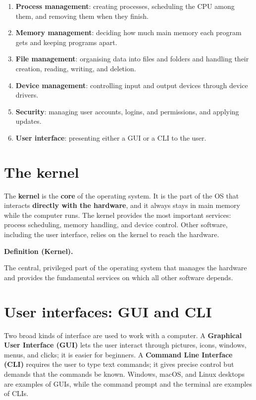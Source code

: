 \documentclass[11pt]{article}
\newenvironment{definitionbox}[1]{%
  \par\noindent\textbf{Definition (#1).}\ \itshape
}{\par\vspace{0.3em}}
\begin{document}
\begin{enumerate}
  \item \textbf{Process management}: creating processes, scheduling the CPU
    among them, and removing them when they finish.
  \item \textbf{Memory management}: deciding how much main memory each
    program gets and keeping programs apart.
  \item \textbf{File management}: organising data into files and folders and
    handling their creation, reading, writing, and deletion.
  \item \textbf{Device management}: controlling input and output devices
    through device drivers.
  \item \textbf{Security}: managing user accounts, logins, and permissions, and
    applying updates.
  \item \textbf{User interface}: presenting either a GUI or a CLI to the user.
\end{enumerate}

\section{The kernel}
The \textbf{kernel} is the \textbf{core} of the operating system. It is the
part of the OS that interacts \textbf{directly with the hardware}, and it
always stays in main memory while the computer runs. The kernel provides the
most important services: process scheduling, memory handling, and device
control. Other software, including the user interface, relies on the kernel to
reach the hardware.

\begin{definitionbox}{Kernel}
The central, privileged part of the operating system that manages the hardware
and provides the fundamental services on which all other software depends.
\end{definitionbox}

\section{User interfaces: GUI and CLI}
Two broad kinds of interface are used to work with a computer. A
\textbf{Graphical User Interface (GUI)} lets the user interact through
pictures, icons, windows, menus, and clicks; it is easier for beginners. A
\textbf{Command Line Interface (CLI)} requires the user to type text commands;
it gives precise control but demands that the commands be known. Windows,
macOS, and Linux desktops are examples of GUIs, while the command prompt and
the terminal are examples of CLIs.
\end{document}
